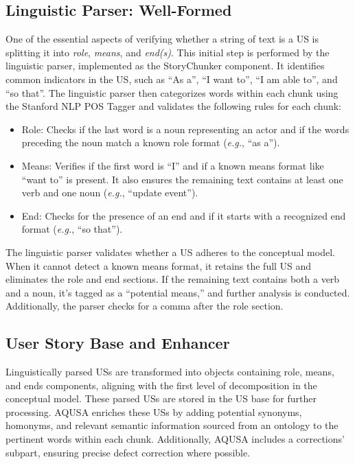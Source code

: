 \subsection*{\normalsize{Linguistic Parser: Well-Formed}}
One of the essential aspects of verifying whether a string of text is a US is splitting it into \emph{role}, \emph{means}, and \emph{end(s)}. This initial step is performed by the linguistic parser, implemented as the StoryChunker component. It identifies common indicators in the US, such as \enquote{As a}, \enquote{I want to}, \enquote{I am able to}, and \enquote{so that}. The linguistic parser then categorizes words within each chunk using the Stanford NLP POS Tagger and validates the following rules for each chunk:
\begin{itemize}
\item Role: Checks if the last word is a noun representing an actor and if the words preceding the noun match a known role format (\emph{e.g.}, \enquote{as a}).
\item Means: Verifies if the first word is \enquote{I} and if a known means format like \enquote{want to} is present. It also ensures the remaining text contains at least one verb and one noun (\emph{e.g.}, \enquote{update event}).
\item End: Checks for the presence of an end and if it starts with a recognized end format (\emph{e.g.}, \enquote{so that}).
\end{itemize}
The linguistic parser validates whether a US adheres to the conceptual model. When it cannot detect a known means format, it retains the full US and eliminates the role and end sections. If the remaining text contains both a verb and a noun, it's tagged as a \enquote{potential means,} and further analysis is conducted. Additionally, the parser checks for a comma after the role section.
\subsection*{\normalsize{User Story Base and Enhancer}}
Linguistically parsed USs are transformed into objects containing role, means, and ends components, aligning with the first level of decomposition in the conceptual model. These parsed USs are stored in the US base for further processing. AQUSA enriches these USs by adding potential synonyms, homonyms, and relevant semantic information sourced from an ontology to the pertinent words within each chunk. Additionally, AQUSA includes a corrections' subpart, ensuring precise defect correction where possible.
